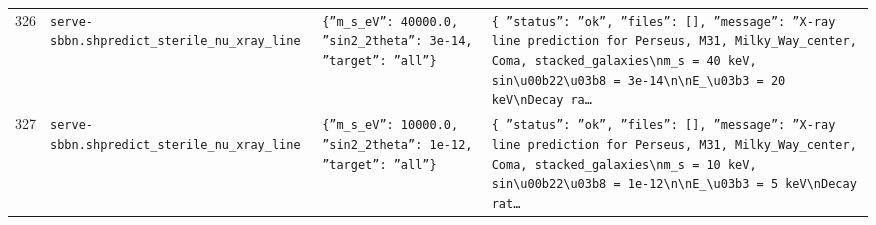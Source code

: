 \documentclass[11pt,a4paper]{article}
\begin{document}
\begin{longtable}{@{}p{}p{}p{}p{}@{}}
326 & \texttt{serve-sbbn.sh}\newline\texttt{predict\_\allowbreak{}sterile\_\allowbreak{}nu\_\allowbreak{}xray\_\allowbreak{}line} & \texttt{\{''m\_\allowbreak{}s\_\allowbreak{}eV'':\allowbreak{} 40000.0,\allowbreak{} ''sin2\_\allowbreak{}2theta'':\allowbreak{} 3e-14,\allowbreak{} ''target'':\allowbreak{} ''all''\}\allowbreak{}} & \texttt{\{   ''status'':\allowbreak{} ''ok'',\allowbreak{}   ''files'':\allowbreak{} []\allowbreak{},\allowbreak{}   ''message'':\allowbreak{} ''X-ray line prediction for Perseus,\allowbreak{} M31,\allowbreak{} Milky\_\allowbreak{}Way\_\allowbreak{}center,\allowbreak{} Coma,\allowbreak{} stacked\_\allowbreak{}galaxies\textbackslash{}\allowbreak{}nm\_\allowbreak{}s =\allowbreak{} 40 keV,\allowbreak{} sin\textbackslash{}\allowbreak{}u00b22\textbackslash{}\allowbreak{}u03b8 =\allowbreak{} 3e-14\textbackslash{}\allowbreak{}n\textbackslash{}\allowbreak{}nE\_\allowbreak{}\textbackslash{}\allowbreak{}u03b3 =\allowbreak{} 20 keV\textbackslash{}\allowbreak{}nDecay ra\ldots{}\allowbreak{}} \\
327 & \texttt{serve-sbbn.sh}\newline\texttt{predict\_\allowbreak{}sterile\_\allowbreak{}nu\_\allowbreak{}xray\_\allowbreak{}line} & \texttt{\{''m\_\allowbreak{}s\_\allowbreak{}eV'':\allowbreak{} 10000.0,\allowbreak{} ''sin2\_\allowbreak{}2theta'':\allowbreak{} 1e-12,\allowbreak{} ''target'':\allowbreak{} ''all''\}\allowbreak{}} & \texttt{\{   ''status'':\allowbreak{} ''ok'',\allowbreak{}   ''files'':\allowbreak{} []\allowbreak{},\allowbreak{}   ''message'':\allowbreak{} ''X-ray line prediction for Perseus,\allowbreak{} M31,\allowbreak{} Milky\_\allowbreak{}Way\_\allowbreak{}center,\allowbreak{} Coma,\allowbreak{} stacked\_\allowbreak{}galaxies\textbackslash{}\allowbreak{}nm\_\allowbreak{}s =\allowbreak{} 10 keV,\allowbreak{} sin\textbackslash{}\allowbreak{}u00b22\textbackslash{}\allowbreak{}u03b8 =\allowbreak{} 1e-12\textbackslash{}\allowbreak{}n\textbackslash{}\allowbreak{}nE\_\allowbreak{}\textbackslash{}\allowbreak{}u03b3 =\allowbreak{} 5 keV\textbackslash{}\allowbreak{}nDecay rat\ldots{}\allowbreak{}} \\

\end{longtable}
\end{document}
